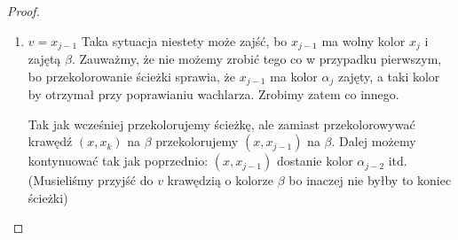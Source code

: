 \begin{proof}
\begin{enumerate}
            \item $v = x_{j - 1}$ 
            Taka sytuacja niestety może zajść, bo $x_{j-1}$ ma wolny kolor $x_j$ i zajętą $\beta$.
            Zauważmy, że nie możemy zrobić tego co w przypadku pierwszym, bo przekolorowanie ścieżki sprawia, że $x_{j-1}$ ma kolor $\alpha_j$ zajęty, a taki kolor by otrzymał przy poprawianiu wachlarza. Zrobimy zatem co innego.
            
            Tak jak wcześniej przekolorujemy ścieżkę,
            ale zamiast przekolorowywać krawędź $(x, x_k)$ na $\beta$
            przekolorujemy $(x, x_{j-1})$ na $\beta$. 
            Dalej możemy kontynuować tak jak poprzednio: $(x, x_{j-1})$ dostanie kolor $\alpha_{j-2}$ itd. (Musieliśmy przyjść do \(v\) krawędzią o kolorze \(\beta\) bo inaczej nie byłby to koniec ścieżki)
            

\end{enumerate}
\end{proof}
